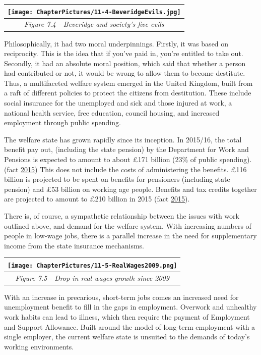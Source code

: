 \documentclass[]{tufte-handout}
\begin{document}
\begin{longtable}[]{@{}c@{}}
\toprule
\texttt{[image: ChapterPictures/11-4-BeveridgeEvils.jpg]}\tabularnewline
\midrule
\endhead
\emph{Figure 7.4 - Beveridge and society's five evils}\tabularnewline
\bottomrule
\end{longtable}

Philosophically, it had two moral underpinnings. Firstly, it was based
on reciprocity. This is the idea that if you've paid in, you're entitled
to take out. Secondly, it had an absolute moral position, which said
that whether a person had contributed or not, it would be wrong to allow
them to become destitute. Thus, a multifaceted welfare system emerged in
the United Kingdom, built from a raft of different policies to protect
the citizens from destitution. These include social insurance for the
unemployed and sick and those injured at work, a national health
service, free education, council housing, and increased employment
through public spending.

The welfare state has grown rapidly since its inception. In 2015/16, the
total benefit pay out, (including the state pension) by the Department
for Work and Pensions is expected to amount to about £171 billion (23\%
of public spending).(fact \protect\hyperlink{ref-Fullfact2015}{2015})
This does not include the costs of administering the benefits. £116
billion is projected to be spent on benefits for pensioners (including
state pension) and £53 billion on working age people. Benefits and tax
credits together are projected to amount to £210 billion in 2015 (fact
\protect\hyperlink{ref-Fullfact2015}{2015}).

There is, of course, a sympathetic relationship between the issues with
work outlined above, and demand for the welfare system. With increasing
numbers of people in low-wage jobs, there is a parallel increase in the
need for supplementary income from the state insurance mechanisms.

\begin{longtable}[]{@{}c@{}}
\toprule
\texttt{[image: ChapterPictures/11-5-RealWages2009.png]}\tabularnewline
\midrule
\endhead
\emph{Figure 7.5 - Drop in real wages growth since 2009}\tabularnewline
\bottomrule
\end{longtable}

With an increase in precarious, short-term jobs comes an increased need
for unemployment benefit to fill in the gaps in employment. Overwork and
unhealthy work habits can lead to illness, which then require the
payment of Employment and Support Allowance. Built around the model of
long-term employment with a single employer, the current welfare state
is unsuited to the demands of today's working environments.
\end{document}

